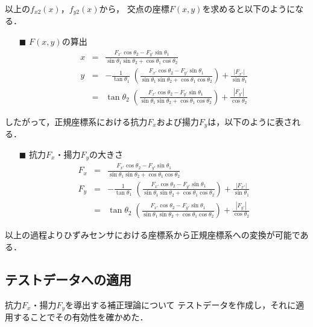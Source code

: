 \documentclass[twocolumn,a4j]{jsarticle}
\begin{document}
以上の$f_{x2}\left(x\right)$，$f_{y2}\left(x\right)$から，
交点の座標$F\left(x,y\right)$を求めると以下のようになる．

\begin{itemize}
    \item [$\blacksquare$] $F\left(x,y\right)$の算出
        \begin{eqnarray*}
              x &=& \frac{F_{x'} \cos \theta_2 - F_{y'} \sin \theta_1}{\sin \theta_1 \sin \theta_2 + \cos \theta_1 \cos \theta_2}\\          
              y &=& - \frac{1}{\tan \theta_1} \; \left(\frac{F_{x'} \cos \theta_2 - F_{y'} \sin \theta_1}{\sin \theta_1 \sin \theta_2 + \cos \theta_1 \cos \theta_2}\right) + \frac{|F_{x'}|}{\sin \theta_1}\\
                &=& \tan \theta_2\; \left(\frac{F_{x'} \cos \theta_2 - F_{y'} \sin \theta_1}{\sin \theta_1 \sin \theta_2 + \cos \theta_1 \cos \theta_2}\right) + \frac{|F_{y'}|}{\cos \theta_2}
        \end{eqnarray*}  
\end{itemize}

したがって，正規座標系における抗力$F_x$および揚力$F_y$は，以下のように表される．

\begin{itemize}
    \item [$\blacksquare$] 抗力$F_x$・揚力$F_y$の大きさ
          \begin{eqnarray*}
            F_x &=& \frac{F_{x'} \cos \theta_2 - F_{y'} \sin \theta_1}{\sin \theta_1 \sin \theta_2 + \cos \theta_1 \cos \theta_2}\\          
            F_y &=& - \frac{1}{\tan \theta_1} \; \left(\frac{F_{x'} \cos \theta_2 - F_{y'} \sin \theta_1}{\sin \theta_1 \sin \theta_2 + \cos \theta_1 \cos \theta_2}\right) + \frac{|F_{x'}|}{\sin \theta_1}\\
              &=& \tan \theta_2\; \left(\frac{F_{x'} \cos \theta_2 - F_{y'} \sin \theta_1}{\sin \theta_1 \sin \theta_2 + \cos \theta_1 \cos \theta_2}\right) + \frac{|F_{y'}|}{\cos \theta_2}
          \end{eqnarray*}
\end{itemize}

以上の過程よりひずみセンサにおける座標系から正規座標系への変換が可能である．

\newpage

\subsection{テストデータへの適用}
抗力$F_x$・揚力$F_y$を導出する補正理論について
テストデータを作成し，それに適用することでその有効性を確かめた．
\end{document}

